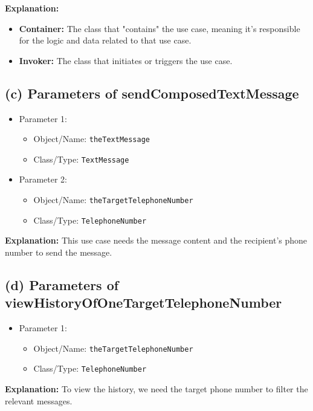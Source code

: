 \documentclass{article}
\begin{document}
\textbf{Explanation:}
\begin{itemize}
    \item \textbf{Container:} The class that "contains" the use case, meaning it's responsible for the logic and data related to that use case.
    \item \textbf{Invoker:} The class that initiates or triggers the use case.
\end{itemize}

\subsection*{(c) Parameters of sendComposedTextMessage}

\begin{itemize}
    \item Parameter 1:
    \begin{itemize}
        \item Object/Name: \texttt{theTextMessage}
        \item Class/Type: \texttt{TextMessage}
    \end{itemize}
    \item Parameter 2:
    \begin{itemize}
        \item Object/Name: \texttt{theTargetTelephoneNumber}
        \item Class/Type: \texttt{TelephoneNumber}
    \end{itemize}
\end{itemize}

\textbf{Explanation:} This use case needs the message content and the recipient's phone number to send the message.

\subsection*{(d) Parameters of viewHistoryOfOneTargetTelephoneNumber}

\begin{itemize}
    \item Parameter 1:
    \begin{itemize}
        \item Object/Name: \texttt{theTargetTelephoneNumber}
        \item Class/Type: \texttt{TelephoneNumber}
    \end{itemize}
\end{itemize}

\textbf{Explanation:} To view the history, we need the target phone number to filter the relevant messages.
\end{document}
